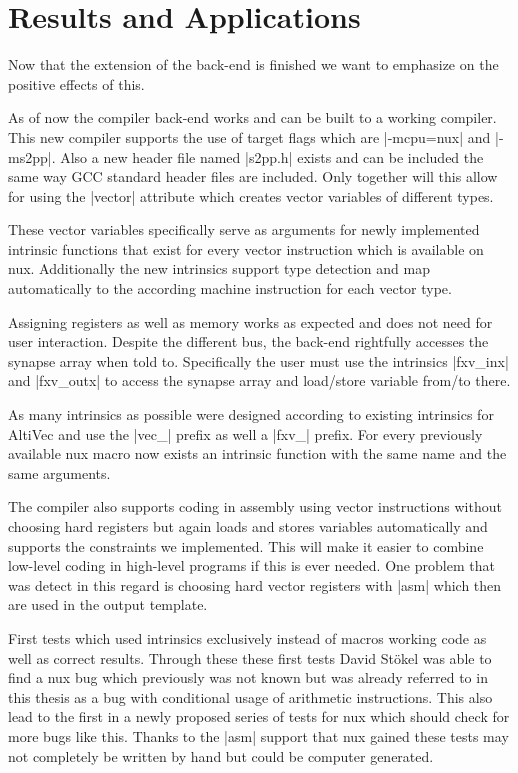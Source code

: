 \chapter{Results and Applications}
\label{chapter:results}

Now that the extension of the back-end is finished we want to emphasize on the positive effects of this.

As of now the compiler back-end works and can be built to a working compiler.
This new compiler supports the use of target flags which are |-mcpu=nux| and |-ms2pp|.
Also a new header file named |s2pp.h| exists and can be included the same way GCC standard header files are included.
Only together will this allow for using the |vector| attribute which creates vector variables of different types.

These vector variables specifically serve as arguments for newly implemented intrinsic functions that exist for every vector instruction which is available on nux.
Additionally the new intrinsics support type detection and map automatically to the according machine instruction for each vector type.

Assigning registers as well as memory works as expected and does not need for user interaction.
Despite the different bus, the back-end rightfully accesses the synapse array when told to.
Specifically the user must use the intrinsics |fxv_inx| and |fxv_outx| to access the synapse array and load/store variable from/to there.

As many intrinsics as possible were designed according to existing intrinsics for AltiVec and use the |vec_| prefix as well a |fxv_| prefix.
For every previously available nux macro now exists an intrinsic function with the same name and the same arguments.

The compiler also supports coding in assembly using vector instructions without choosing hard registers but again loads and stores variables automatically and supports the constraints we implemented.
This will make it easier to combine low-level coding in high-level programs if this is ever needed.
One problem that was detect in this regard is choosing hard vector registers with |asm| which then are used in the output template.

First tests which used intrinsics exclusively instead of macros working code as well as correct results.
Through these these first tests David Stökel was able to find a nux bug which previously was not known but was already referred to in this thesis as a bug with conditional usage of arithmetic instructions.
This also lead to the first in a newly proposed series of tests for nux which should check for more bugs like this.
Thanks to the |asm| support that nux gained these tests may not completely be written by hand but could be computer generated.

